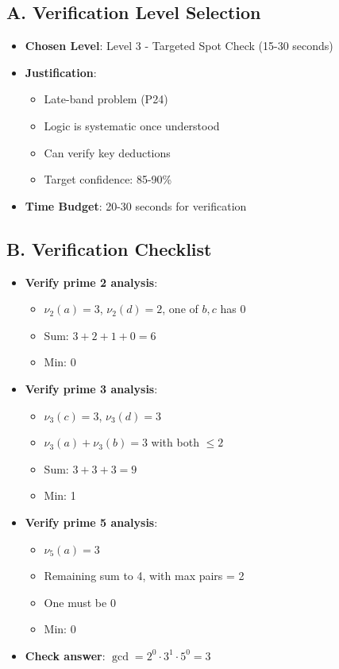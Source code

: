 \documentclass[12pt]{article}
\begin{document}
\begin{verificationbox}
\subsection*{A. Verification Level Selection}
\begin{itemize}[leftmargin=*]
    \item \textbf{Chosen Level}: Level 3 - Targeted Spot Check (15-30 seconds)
    \item \textbf{Justification}: 
    \begin{itemize}
        \item Late-band problem (P24)
        \item Logic is systematic once understood
        \item Can verify key deductions
        \item Target confidence: 85-90\%
    \end{itemize}
    \item \textbf{Time Budget}: 20-30 seconds for verification
\end{itemize}

\subsection*{B. Verification Checklist}
\begin{itemize}[leftmargin=*]
    \item \textbf{Verify prime 2 analysis}:
    \begin{itemize}
        \item $\nu_2(a) = 3$, $\nu_2(d) = 2$, one of $b,c$ has 0 \checkmark
        \item Sum: $3 + 2 + 1 + 0 = 6$ \checkmark
        \item Min: 0 \checkmark
    \end{itemize}
    \item \textbf{Verify prime 3 analysis}:
    \begin{itemize}
        \item $\nu_3(c) = 3$, $\nu_3(d) = 3$ \checkmark
        \item $\nu_3(a) + \nu_3(b) = 3$ with both $\leq 2$ \checkmark
        \item Sum: $3 + 3 + 3 = 9$ \checkmark
        \item Min: 1 \checkmark
    \end{itemize}
    \item \textbf{Verify prime 5 analysis}:
    \begin{itemize}
        \item $\nu_5(a) = 3$ \checkmark
        \item Remaining sum to 4, with max pairs = 2 \checkmark
        \item One must be 0 \checkmark
        \item Min: 0 \checkmark
    \end{itemize}
    \item \textbf{Check answer}: $\gcd = 2^0 \cdot 3^1 \cdot 5^0 = 3$ \checkmark
\end{itemize}


\end{verificationbox}
\end{document}
